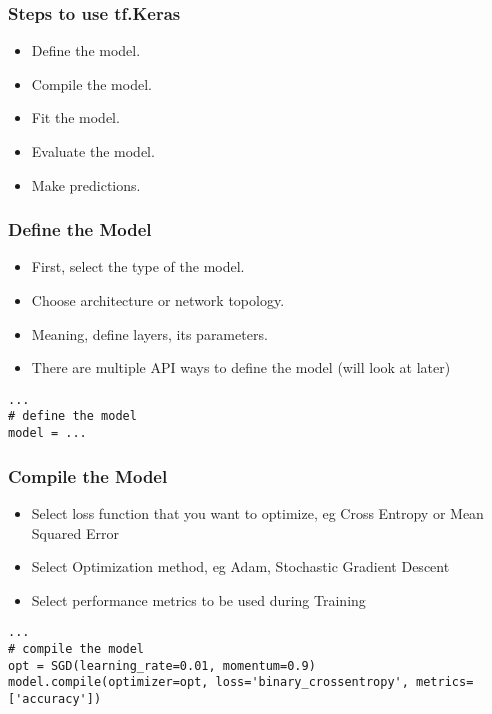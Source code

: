 \begin{frame}[fragile] \frametitle{Steps to use tf.Keras}

\begin{itemize}
\item  Define the model.
\item  Compile the model.
\item  Fit the model.
\item  Evaluate the model.
\item  Make predictions.
\end{itemize}
\end{frame}

\begin{frame}[fragile] \frametitle{Define the Model}

\begin{itemize}
\item  First, select the type of the model.
\item Choose architecture or network topology.
\item Meaning, define layers, its parameters.
\item There are multiple API ways to define the model (will look at later)
\end{itemize}

\begin{lstlisting}
...
# define the model
model = ...
\end{lstlisting}
\end{frame}

\begin{frame}[fragile] \frametitle{Compile the Model}

\begin{itemize}
\item Select loss function that you want to optimize, eg Cross Entropy or Mean Squared Error
\item Select Optimization method, eg Adam, Stochastic Gradient Descent
\item Select performance metrics to be used during Training
\end{itemize}

\begin{lstlisting}
...
# compile the model
opt = SGD(learning_rate=0.01, momentum=0.9)
model.compile(optimizer=opt, loss='binary_crossentropy', metrics=['accuracy'])
\end{lstlisting}
\end{frame}


